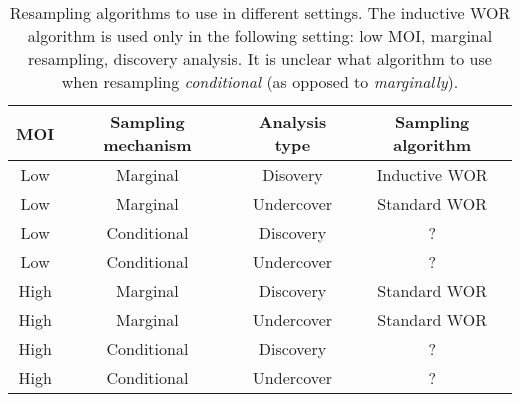 \documentclass[12pt]{article}
\begin{document}
\begin{table}
\begin{tabular}{cccc}
	\hline 
	\textbf{MOI} & \textbf{Sampling mechanism} & \textbf{Analysis type} & \textbf{Sampling algorithm} \\ 
	\hline 
	Low & Marginal & Disovery &  Inductive WOR \\
	\hline 
	Low & Marginal & Undercover & Standard WOR \\ 
	\hline 
	Low & Conditional & Discovery &  ? \\ 
	\hline 
	Low & Conditional & Undercover & ? \\ 
	\hline 
	High & Marginal & Discovery & Standard WOR \\ 
	\hline 
	High & Marginal & Undercover & Standard WOR  \\ 
	\hline 
	High & Conditional & Discovery & ? \\ 
	\hline 
	High & Conditional & Undercover & ? \\ 
	\hline 
\end{tabular}
	\caption{Resampling algorithms to use in different settings. The inductive WOR algorithm is used only in the following setting: low MOI, marginal resampling, discovery analysis. It is unclear what algorithm to use when resampling \textit{conditional} (as opposed to \textit{marginally}).}	\label{sampling_algo}
\end{table}



\end{document}
